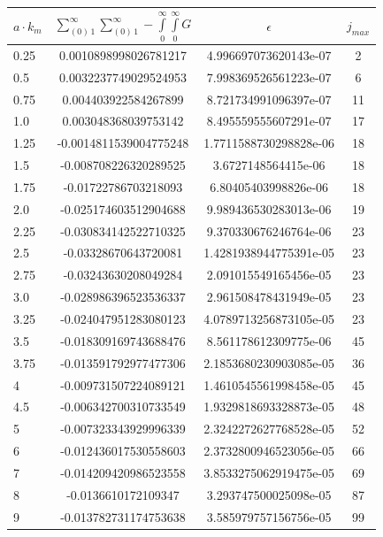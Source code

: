\documentclass[11pt]{article}
\begin{document}
    \begin{center}
\begin{tabular}{ | l | c | c | c | }
\hline
$a \cdot k_m$ & $\sum\limits_{\left(0\right)\,1}^{\infty}\sum\limits_{\left(0\right)\,1}^{\infty}-\int\limits_{0}^{\infty}\int\limits_{0}^{\infty}G$ & $\epsilon$ & $j_{max}$ \\
\hline
0.25 & 0.0010898998026781217 & 4.996697073620143e-07 & 2 \\
0.5 & 0.0032237749029524953 & 7.998369526561223e-07 & 6 \\
0.75 & 0.004403922584267899 & 8.721734991096397e-07 & 11 \\
1.0 & 0.003048368039753142 & 8.495559555607291e-07 & 17 \\
1.25 & -0.0014811539004775248 & 1.7711588730298828e-06 & 18 \\
1.5 & -0.008708226320289525 & 3.6727148564415e-06 & 18 \\
1.75 & -0.01722786703218093 & 6.80405403998826e-06 & 18 \\
2.0 & -0.025174603512904688 & 9.989436530283013e-06 & 19 \\
2.25 & -0.030834142522710325 & 9.370330676246764e-06 & 23 \\
2.5 & -0.03328670643720081 & 1.4281938944775391e-05 & 23 \\
2.75 & -0.03243630208049284 & 2.091015549165456e-05 & 23 \\
3.0 & -0.028986396523536337 & 2.961508478431949e-05 & 23 \\
3.25 & -0.024047951283080123 & 4.0789713256873105e-05 & 23 \\
3.5 & -0.018309169743688476 & 8.561178612309775e-06 & 45 \\
3.75 & -0.013591792977477306 & 2.1853680230903085e-05 & 36 \\
4 & -0.009731507224089121 & 1.4610545561998458e-05 & 45 \\
4.5 & -0.006342700310733549 & 1.9329818693328873e-05 & 48 \\
5 & -0.007323343929996339 & 2.3242272627768528e-05 & 52 \\
6 & -0.012436017530558603 & 2.3732800946523056e-05 & 66 \\
7 & -0.014209420986523558 & 3.8533275062919475e-05 & 69 \\
8 & -0.0136610172109347 & 3.293747500025098e-05 & 87 \\
9 & -0.013782731174753638 & 3.585979757156756e-05 & 99 \\
\hline
\end{tabular}
\end{center}
\end{document}
